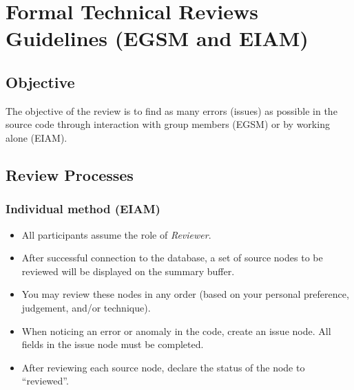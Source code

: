 
%

\chapter {Formal Technical Reviews Guidelines (EGSM and EIAM)}


\section*{Objective}
The objective of the review is to find as many errors (issues) as
possible in the source code through interaction with group members
(EGSM) or by working alone (EIAM).

\section*{Review Processes}
\subsection*{Individual method (EIAM)}
\begin {itemize}
\item All participants assume the role of {\it Reviewer}.
\item After successful connection to the database, a set of source
  nodes to be reviewed will be displayed on the summary buffer.
\item You may review these nodes in any order (based on your
personal preference, judgement, and/or technique).
\item When noticing an error or anomaly in the code, 
  create an issue node. All fields in the issue node must be completed.
\item After reviewing each source node, declare the status of the node
to ``reviewed''. 
\end{itemize}

